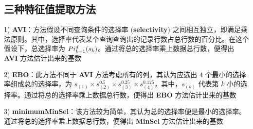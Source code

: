     \subsection{三种特征值提取方法\cite{ref13}}
        \par 1) \textbf{AVI}：方法假设不同查询条件的选择率 (\textbf{selectivity}) 之间相互独立，即满足乘法原则。其中，选择率代表某个查询查询出的记录行数占总行数的百分比。在这个假设下，总选择率为 $\\Pi_{k=1}^{d}(s_k)$。通过将总的选择率乘上数据总行数，便得出 \textbf{AVI} 方法估计出来的基数
        \par 2) \textbf{EBO}：此方法不同于 \textbf{AVI} 方法考虑所有的列，其认为应选出 $4$ 个最小的选择率组成总的选择率，为 $s_{(1)}\times s_{(2)}^{0.5} \times s_{(3)}^{0.25} \times s_{(4)}^{0.125}$，其中，$s_{(k)}$ 代表第 $k$ 小的选择率。通过将总的选择率乘上数据总行数，便得出 \textbf{EBO} 方法估计出来的基数
        \par 3) \textbf{minimumMinSel}：该方法较为简单，其认为总的选择率便是最小的选择率。通过将总的选择率乘上数据总行数，便得出 \textbf{MinSel} 方法估计出来的基数



    
